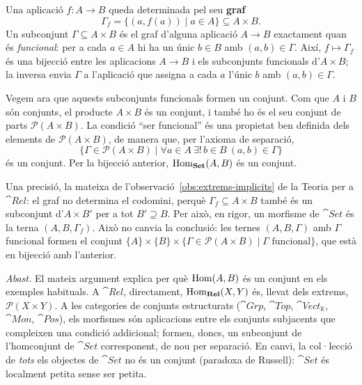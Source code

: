\begin{solucio}
Una aplicació $f\colon A\to B$ queda determinada pel seu \textbf{graf}
\[
\Gamma_f=\{(a,f(a))\mid a\in A\}\subseteq A\times B.
\]
Un subconjunt $\Gamma\subseteq A\times B$ és el graf d'alguna aplicació $A\to B$ exactament quan és \emph{funcional}: per a cada $a\in A$ hi ha un únic $b\in B$ amb $(a,b)\in\Gamma$. Així, $f\mapsto\Gamma_f$ és una bijecció entre les aplicacions $A\to B$ i els subconjunts funcionals d'$A\times B$; la inversa envia $\Gamma$ a l'aplicació que assigna a cada $a$ l'únic $b$ amb $(a,b)\in\Gamma$.

Vegem ara que aquests subconjunts funcionals formen un conjunt. Com que $A$ i $B$ són conjunts, el producte $A\times B$ és un conjunt, i també ho és el seu conjunt de parts $\mathcal P(A\times B)$. La condició \enquote{ser funcional} és una propietat ben definida dels elements de $\mathcal P(A\times B)$, de manera que, per l'axioma de separació,
\[
\{\Gamma\in\mathcal P(A\times B)\mid \forall a\in A\ \exists!\,b\in B\ (a,b)\in\Gamma\}
\]
és un conjunt. Per la bijecció anterior, $\operatorname{Hom}_{\mathbf{Set}}(A,B)$ és un conjunt.

Una precisió, la mateixa de l'observació~\ref{obs:extrems-implicits} de la Teoria per a $\cat{Rel}$: el graf no determina el codomini, perquè $\Gamma_f\subseteq A\times B$ també és un subconjunt d'$A\times B'$ per a tot $B'\supseteq B$. Per això, en rigor, un morfisme de $\cat{Set}$ és la terna $(A,B,\Gamma_f)$. Això no canvia la conclusió: les ternes $(A,B,\Gamma)$ amb $\Gamma$ funcional formen el conjunt $\{A\}\times\{B\}\times\{\Gamma\in\mathcal P(A\times B)\mid \Gamma\text{ funcional}\}$, que està en bijecció amb l'anterior.

\emph{Abast.} El mateix argument explica per què $\operatorname{Hom}(A,B)$ és un conjunt en els exemples habituals. A $\cat{Rel}$, directament, $\operatorname{Hom}_{\mathbf{Rel}}(X,Y)$ és, llevat dels extrems, $\mathcal P(X\times Y)$. A les categories de conjunts estructurats ($\cat{Grp}$, $\cat{Top}$, $\cat{Vect}_{\mathbb K}$, $\cat{Mon}$, $\cat{Pos}$), els morfismes són aplicacions entre els conjunts subjacents que compleixen una condició addicional; formen, doncs, un subconjunt de l'homconjunt de $\cat{Set}$ corresponent, de nou per separació. En canvi, la col·lecció de \emph{tots} els objectes de $\cat{Set}$ no és un conjunt (paradoxa de Russell): $\cat{Set}$ és localment petita sense ser petita.
\end{solucio}
